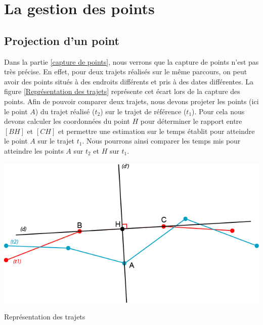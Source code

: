 \chapter{La gestion des points}

\section{Projection d'un point}
Dans la partie \ref{capture de points}, nous verrons que la capture de points n'est pas très précise. En effet, pour deux trajets réalisés sur le même parcours, on peut avoir des points situés à des endroits différents et pris à des dates différentes. La figure \ref{Représentation des trajets} représente cet écart lors de la capture des points. Afin de pouvoir comparer deux trajets, nous devons projeter les points (ici le point $A$) du trajet réalisé ($t_2$) sur le trajet de référence ($t_1$). Pour cela nous devons calculer les coordonnées du point $H$ pour déterminer le rapport entre $[BH]$ et $[CH]$ et permettre une estimation sur le temps établit pour atteindre le point $A$ sur le trajet $t_1$. Nous pourrons ainsi comparer les temps mis pour atteindre les points $A$ sur $t_2$ et $H$ sur $t_1$.

\begin{img}  
	\includegraphics[scale=1]{img/Trajet.png}
	\caption{Représentation des trajets}
	\label{Représentation des trajets}
\end{img}

